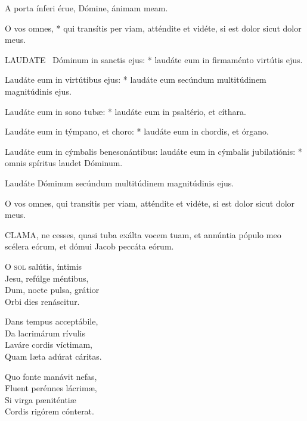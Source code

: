 
 A porta ínferi érue, Dómine, ánimam meam.

 O vos omnes, * qui transítis per viam, atténdite et vidéte, si est dolor sicut dolor meus.

\sectionornament


\lettrine[lines=2]{L}{AUDATE} \textdagger\ Dóminum in sanctis ejus: * laudáte eum in firmaménto virtútis ejus.

Laudáte eum in virtútibus ejus: * laudáte eum secúndum multitúdinem magnitúdinis ejus.

Laudáte eum in sono tubæ: * laudáte eum in psaltério, et cíthara.

Laudáte eum in týmpano, et choro: * laudáte eum in chordis, et órgano.

Laudáte eum in cýmbalis benesonántibus: laudáte eum in cýmbalis jubilatiónis: * omnis spíritus laudet Dóminum.

 Laudáte Dóminum secúndum multitúdinem magnitúdinis ejus.


 O vos omnes, qui transítis per viam, atténdite et vidéte, si est dolor sicut dolor meus.




\lettrine[lines=2]{C}{LAMA}, ne cesses, quasi tuba exálta vocem tuam, et annúntia pópulo meo scélera eórum, et dómui Jacob peccáta eórum.


\lettrine[lines=2]{O}{} \textsc{sol} salútis, íntimis\\
Jesu, refúlge méntibus,\\
Dum, nocte pulsa, grátior\\
Orbi dies renáscitur.

Dans tempus acceptábile,\\
Da lacrimárum rívulis\\
Laváre cordis víctimam,\\
Quam læta adúrat cáritas.

Quo fonte manávit nefas,\\
Fluent perénnes lácrimæ,\\
Si virga pæniténtiæ\\
Cordis rigórem cónterat.


